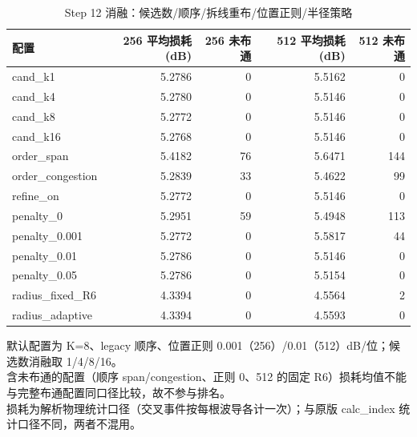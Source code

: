 \begin{table}[htbp]
  \centering
  \caption{Step 12 消融：候选数/顺序/拆线重布/位置正则/半径策略}
  \label{tab:step12-ablation}
  \begin{tabular}{lrrrr}
    \toprule
    配置 & 256 平均损耗 (dB) & 256 未布通 & 512 平均损耗 (dB) & 512 未布通 \\
    \midrule
    cand\_k1 & 5.2786 & 0 & 5.5162 & 0 \\
    cand\_k4 & 5.2780 & 0 & 5.5146 & 0 \\
    cand\_k8 & 5.2772 & 0 & 5.5146 & 0 \\
    cand\_k16 & 5.2768 & 0 & 5.5146 & 0 \\
    order\_span & 5.4182 & 76 & 5.6471 & 144 \\
    order\_congestion & 5.2839 & 33 & 5.4622 & 99 \\
    refine\_on & 5.2772 & 0 & 5.5146 & 0 \\
    penalty\_0 & 5.2951 & 59 & 5.4948 & 113 \\
    penalty\_0.001 & 5.2772 & 0 & 5.5817 & 44 \\
    penalty\_0.01 & 5.2786 & 0 & 5.5146 & 0 \\
    penalty\_0.05 & 5.2786 & 0 & 5.5154 & 0 \\
    radius\_fixed\_R6 & 4.3394 & 0 & 4.5564 & 2 \\
    radius\_adaptive & 4.3394 & 0 & 4.5593 & 0 \\
    \bottomrule
  \end{tabular}
  \par\vspace{2pt}
  \begin{flushleft}\footnotesize
  默认配置为 K=8、legacy 顺序、位置正则 0.001（256）/0.01（512）dB/位；候选数消融取 1/4/8/16。 \\
  含未布通的配置（顺序 span/congestion、正则 0、512 的固定 R6）损耗均值不能与完整布通配置同口径比较，故不参与排名。 \\
  损耗为解析物理统计口径（交叉事件按每根波导各计一次）；与原版 calc\_index 统计口径不同，两者不混用。 \\
  \end{flushleft}
\end{table}
